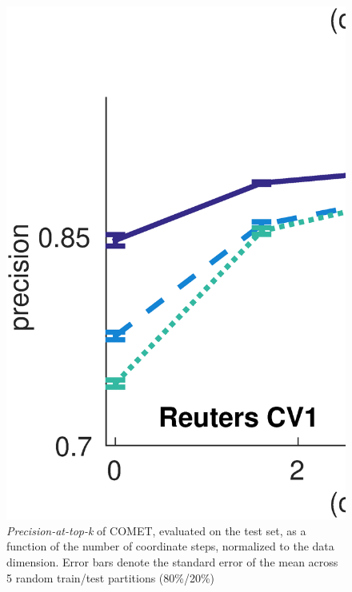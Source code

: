 \documentclass{article}
\begin{document}
\begin{figure}[ht]
\vskip 0.2in
\begin{center}
\centerline{\includegraphics[width=\columnwidth]{COMET_convergence}}
\caption{ \textit{Precision-at-top-k} of COMET, evaluated on the test set, as a function of the number of coordinate steps, normalized to the data dimension. Error bars denote the standard error of the mean across 5 random train/test partitions (80\%/20\%) }
\label{cometConvergeFig}
\end{center}
\vskip -0.2in
\end{figure} 
\end{document}

